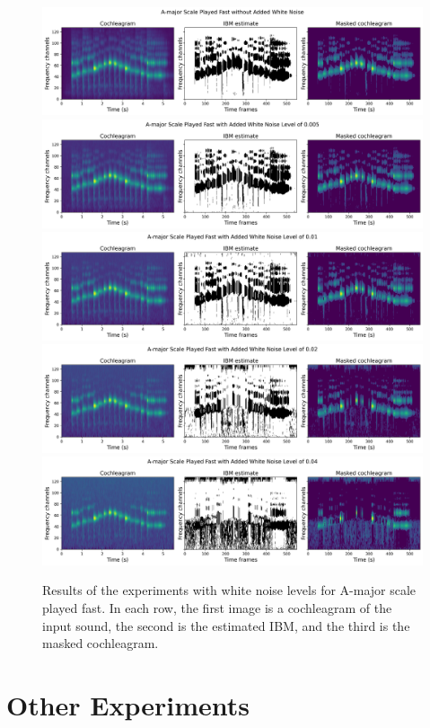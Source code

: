 \begin{figure}[t]
	\centering
	\includegraphics[width=\textwidth]{include/experiments_white_noise_A-major_0.jpg}
	\includegraphics[width=\textwidth]{include/experiments_white_noise_A-major_0,005.jpg}
	\includegraphics[width=\textwidth]{include/experiments_white_noise_A-major_0,01.jpg}
	\includegraphics[width=\textwidth]{include/experiments_white_noise_A-major_0,02.jpg}
	\includegraphics[width=\textwidth]{include/experiments_white_noise_A-major_0,04.jpg}
	\caption[Results of experiments with white noise levels]{Results of the experiments with white noise levels for A-major scale played fast. In each row, the first image is a cochleagram of the input sound, the second is the estimated IBM, and the third is the masked cochleagram.}
	\label{img:white_noise_experiments}
\end{figure}

\section{Other Experiments}
